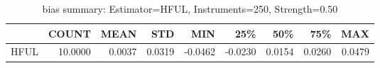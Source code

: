 \begin{table}[ht]
\centering
\caption{bias summary: Estimator=HFUL, Instruments=250, Strength=0.50}
\begin{tabular}{lrrrrrrrr}
\toprule
 & COUNT & MEAN & STD & MIN & 25\% & 50\% & 75\% & MAX \\
\midrule
HFUL & 10.0000 & 0.0037 & 0.0319 & -0.0462 & -0.0230 & 0.0154 & 0.0260 & 0.0479 \\
\bottomrule
\end{tabular}
\end{table}
